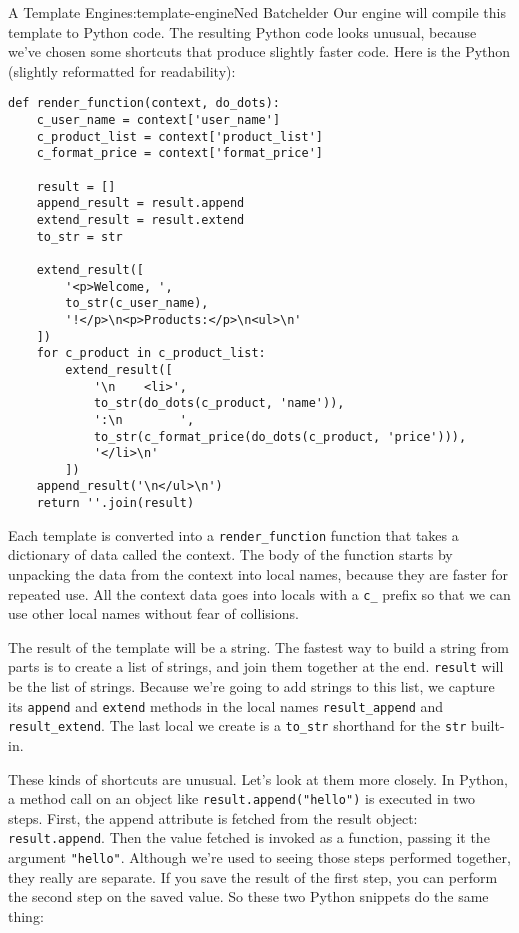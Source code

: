 \begin{aosachapter}{A Template Engine}{s:template-engine}{Ned Batchelder}
Our engine will compile this template to Python code. The resulting
Python code looks unusual, because we've chosen some shortcuts that
produce slightly faster code. Here is the Python (slightly reformatted
for readability):

\begin{verbatim}
def render_function(context, do_dots):
    c_user_name = context['user_name']
    c_product_list = context['product_list']
    c_format_price = context['format_price']

    result = []
    append_result = result.append
    extend_result = result.extend
    to_str = str

    extend_result([
        '<p>Welcome, ',
        to_str(c_user_name),
        '!</p>\n<p>Products:</p>\n<ul>\n'
    ])
    for c_product in c_product_list:
        extend_result([
            '\n    <li>',
            to_str(do_dots(c_product, 'name')),
            ':\n        ',
            to_str(c_format_price(do_dots(c_product, 'price'))),
            '</li>\n'
        ])
    append_result('\n</ul>\n')
    return ''.join(result)
\end{verbatim}

Each template is converted into a \texttt{render\_function} function
that takes a dictionary of data called the context. The body of the
function starts by unpacking the data from the context into local names,
because they are faster for repeated use. All the context data goes into
locals with a \texttt{c\_} prefix so that we can use other local names
without fear of collisions.

The result of the template will be a string. The fastest way to build a
string from parts is to create a list of strings, and join them together
at the end. \texttt{result} will be the list of strings. Because we're
going to add strings to this list, we capture its \texttt{append} and
\texttt{extend} methods in the local names \texttt{result\_append} and
\texttt{result\_extend}. The last local we create is a \texttt{to\_str}
shorthand for the \texttt{str} built-in.

These kinds of shortcuts are unusual. Let's look at them more closely.
In Python, a method call on an object like
\texttt{result.append("hello")} is executed in two steps. First, the
append attribute is fetched from the result object:
\texttt{result.append}. Then the value fetched is invoked as a function,
passing it the argument \texttt{"hello"}. Although we're used to seeing
those steps performed together, they really are separate. If you save
the result of the first step, you can perform the second step on the
saved value. So these two Python snippets do the same thing:


\end{aosachapter}
